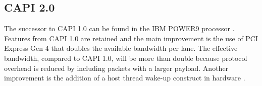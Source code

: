 

\subsection{CAPI 2.0}
The successor to CAPI 1.0 can be found in the IBM POWER9 processor \cite{stuecheli-power9}. Features from CAPI 1.0 are retained and the main improvement is the use of PCI Express Gen 4 that doubles the available bandwidth per lane. The effective bandwidth, compared to CAPI 1.0, will be more than double because protocol overhead is reduced by including packets with a larger payload. Another improvement is the addition of a host thread wake-up construct in hardware \cite{opencapi-enablement}.





